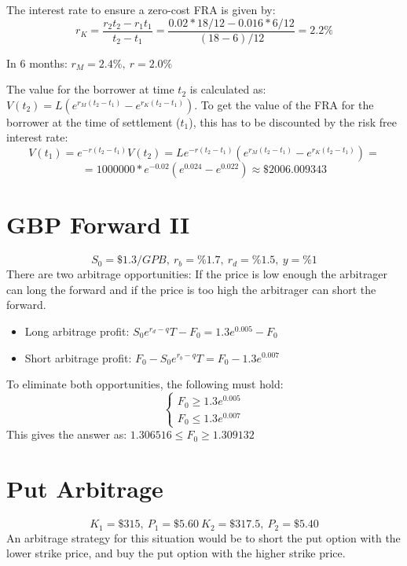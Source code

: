 \documentclass{article}
\begin{document}
The interest rate to ensure a zero-cost FRA is given by:
$$r_K = \frac{r_2t_2 - r_1t_1}{t_2-t_1} = \frac{0.02 * 18/12 - 0.016*6/12}{(18-6)/12} = 2.2\%$$

In 6 months: $r_M = 2.4\%, \ r=2.0\%$

The value for the borrower at time $t_2$ is calculated as: $ V(t_2) = L\left( e^{r_M(t_2-t_1)} - e^{r_K(t_2-t_1)} \right)$. To get the value of the FRA for the borrower at the time of settlement ($t_1$), this has to be discounted by the risk free interest rate:
$$V(t_1) = e^{-r(t_2-t_1)}V(t_2) = Le^{-r(t_2-t_1)}\left( e^{r_M(t_2-t_1)} - e^{r_K(t_2-t_1)} \right) = $$
$$ = 1000000 * e^{-0.02} \left( e^{0.024} - e^{0.022} \right) \approx \$2006.009343$$

\section{GBP Forward II}
$$S_0 = \$1.3/GPB, \ r_b = \%1.7, \ r_d = \%1.5, \ y=\%1$$
There are two arbitrage opportunities: If the price is low enough the arbitrager can long the forward and if the price is too high the arbitrager can short the forward.
\begin{itemize}
	\item Long arbitrage profit: $S_0e^{r_{d}-q}T - F_0= 1.3e^{0.005} - F_0$
	\item Short arbitrage profit: $F_0 - S_0e^{r_{b}-q}T = F_0 - 1.3e^{0.007}$
\end{itemize}

To eliminate both opportunities, the following must hold: 
$$\begin{cases} F_0 \geq 1.3e^{0.005} \\ F_0 \leq 1.3e^{0.007} \end{cases}$$
This gives the answer as: $1.306516 \leq F_0 \geq 1.309132$


\section{Put Arbitrage}
$$K_1 = \$315, \ P_1 = \$5.60 \ K_2 = \$317.5, \ P_2 = \$5.40$$
An arbitrage strategy for this situation would be to short the put option with the lower strike price, and buy the put option with the higher strike price. 
\end{document}
